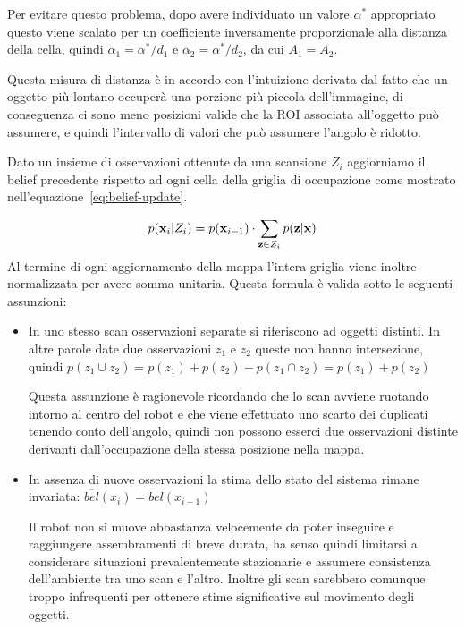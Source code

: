\documentclass[a4paper]{article}
\begin{document}
		
	Per evitare questo problema, dopo avere
	individuato un valore $ \alpha ^* $ appropriato questo viene scalato per un
	coefficiente inversamente proporzionale alla distanza della cella, quindi $
	\alpha _1 = \alpha ^*/d_1 $ e $ \alpha _2=\alpha ^*/d_2 $, da cui $A_1=A_2$. 
	
	Questa misura di distanza è in accordo con l'intuizione derivata dal fatto
	che un oggetto più lontano occuperà una porzione più piccola dell'immagine,
	di conseguenza ci sono meno posizioni valide che la ROI associata
	all'oggetto può assumere, e quindi l'intervallo di valori che può assumere
	l'angolo è ridotto.

	
	Dato un insieme di osservazioni ottenute da una scansione $ Z_i $ aggiorniamo il belief precedente rispetto ad ogni cella della griglia di occupazione come mostrato nell'equazione~\ref{eq:belief-update}.

	\begin{equation}\label{eq:belief-update}
		p({\bf x}_i | Z_i) = p({\bf x}_{i-1}) \cdot 
		\sum_{{\bf z} \in Z_i} p({\bf z} | {\bf x})
	\end{equation}
	Al termine di ogni aggiornamento della mappa l'intera griglia viene inoltre
	normalizzata per avere somma unitaria.  
	Questa formula è valida sotto le seguenti assunzioni:
	\begin{itemize}
		\item In uno stesso scan osservazioni separate si riferiscono ad
			oggetti distinti. In altre parole date due osservazioni $z_1$ e
			$z_2$ queste non hanno intersezione, quindi $ p(z_1 \cup z_2) =
			p(z_1)+p(z_2)-p( z_1 \cap z_2) = p(z_1)+p(z_2) $ 

			Questa assunzione è ragionevole ricordando che lo scan avviene
			ruotando intorno al centro del robot e che viene effettuato uno
			scarto dei duplicati tenendo conto dell'angolo, quindi non possono
			esserci due osservazioni distinte derivanti dall'occupazione della
			stessa posizione nella mappa.

		\item In assenza di nuove osservazioni la stima dello stato del sistema
			rimane invariata: $ \overline{bel}(x_i) = bel(x_{i-1}) $ 

			Il robot non si muove abbastanza velocemente da poter inseguire e
			raggiungere assembramenti di breve durata, ha senso quindi
			limitarsi a considerare situazioni prevalentemente stazionarie e
			assumere consistenza dell'ambiente tra uno scan e l'altro. Inoltre
			gli scan sarebbero comunque troppo infrequenti per ottenere stime
			significative sul movimento degli oggetti.

	\end{itemize}
\end{document}
